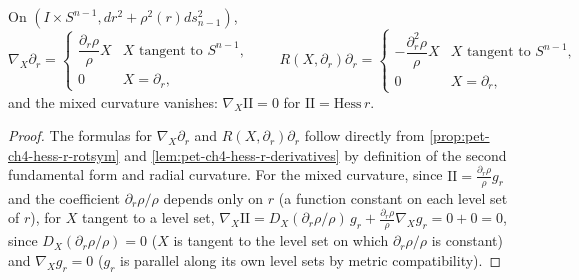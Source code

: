 \begin{proposition}
  \label{prop:pet-ch4-rotsym-radial-jacobi}
  On $(I\times S^{n-1},dr^2+\rho^2(r)ds_{n-1}^2)$,
  \[
    \nabla_X\partial_r=\begin{cases}\dfrac{\partial_r\rho}{\rho}X&X\text{ tangent to }S^{n-1},\\[4pt]0&X=\partial_r,\end{cases}
    \qquad
    R(X,\partial_r)\partial_r=\begin{cases}-\dfrac{\partial_r^2\rho}{\rho}X&X\text{ tangent to }S^{n-1},\\[4pt]0&X=\partial_r,\end{cases}
  \]
  and the mixed curvature vanishes: $\nabla_X\mathrm{II}=0$ for $\mathrm{II}=\mathrm{Hess}\,r$.
\end{proposition}
\begin{proof}
  \sketch
  The formulas for $\nabla_X\partial_r$ and $R(X,\partial_r)\partial_r$ follow directly
  from \cref{prop:pet-ch4-hess-r-rotsym} and
  \cref{lem:pet-ch4-hess-r-derivatives} by
  definition of the second fundamental form and radial curvature. For the mixed
  curvature, since $\mathrm{II}=\tfrac{\partial_r\rho}{\rho}g_r$ and the coefficient
  $\partial_r\rho/\rho$ depends only on $r$ (a function constant on each level set
  of $r$), for $X$ tangent to a level set,
  $\nabla_X\mathrm{II}=D_X(\partial_r\rho/\rho)\,g_r+\tfrac{\partial_r\rho}{\rho}\nabla_Xg_r=0+0=0$,
  since $D_X(\partial_r\rho/\rho)=0$ ($X$ is tangent to the level set on which
  $\partial_r\rho/\rho$ is constant) and $\nabla_Xg_r=0$ ($g_r$ is parallel along its
  own level sets by metric compatibility).
\end{proof}

